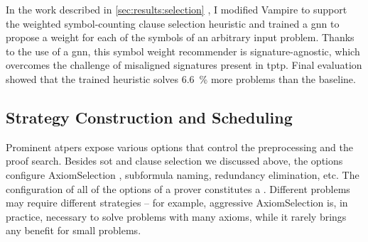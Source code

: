 In the work described in \cref{sec:results:selection} \cite{DBLP:conf/lpar/Bartek023},
I modified Vampire to support the weighted symbol-counting clause selection heuristic
and trained a \gls{gnn} to propose a weight for each of the symbols of an arbitrary input problem.
Thanks to the use of a \gls{gnn}, this symbol weight recommender is signature-agnostic,
which overcomes the challenge of misaligned signatures present in \gls{tptp}.
Final evaluation showed that
the trained heuristic solves \SI{6.6}{\percent} more problems than the baseline.


\subsection{Strategy Construction and Scheduling}

Prominent \glspl{atper} expose various options that control the preprocessing and the proof search.
Besides \gls{sot} and clause selection we discussed above,
the options configure \gls{AxiomSelection} \cite{DBLP:conf/cade/HoderV11}, subformula naming, redundancy elimination, etc.
The configuration of all of the options of a prover constitutes a .
Different problems may require different strategies -- for example, aggressive \gls{AxiomSelection} is, in practice, necessary to solve problems with many axioms, while it rarely brings any benefit for small problems.

